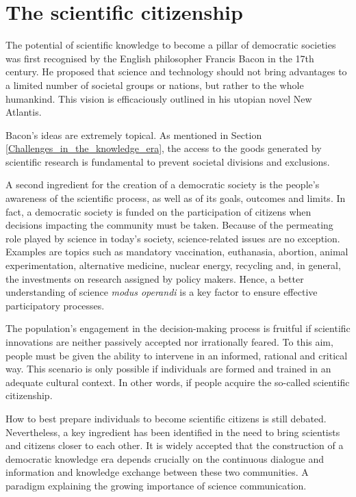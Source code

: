 \section{The scientific citizenship} \label{The_scientific_citizenship}
The potential of scientific knowledge to become a pillar of democratic societies was first recognised by the English philosopher Francis Bacon in the 17th century. He proposed that science and technology should not bring advantages to a limited number of societal groups or nations, but rather to the whole humankind. This vision is efficaciously outlined in his utopian novel New Atlantis.

Bacon's ideas are extremely topical. As mentioned in Section \ref{Challenges_in_the_knowledge_era}, the access to the goods generated by scientific research is fundamental to prevent societal divisions and exclusions.

A second ingredient for the creation of a democratic society is the people's awareness of the scientific process, as well as of its goals, outcomes and limits. In fact, a democratic society is funded on the participation of citizens when decisions impacting the community must be taken. Because of the permeating role played by science in today's society, science-related issues are no exception. Examples are topics such as mandatory vaccination, euthanasia, abortion, animal experimentation, alternative medicine, nuclear energy, recycling and, in general, the investments on research assigned by policy makers. Hence, a better understanding of science \textit{modus operandi} is a key factor to ensure effective participatory processes.    

The population's engagement in the decision-making process is fruitful if scientific innovations are neither passively accepted nor irrationally feared. To this aim, people must be given the ability to intervene in an informed, rational and critical way. This scenario is only possible if individuals are formed and trained in an adequate cultural context. In other words, if people acquire the so-called scientific citizenship.

How to best prepare individuals to become scientific citizens is still debated. Nevertheless, a key ingredient has been identified in the need to bring scientists and citizens closer to each other. It is widely accepted that the construction of a democratic knowledge era depends crucially on the continuous dialogue and information and knowledge exchange between these two communities. A paradigm explaining the growing importance of science communication.

